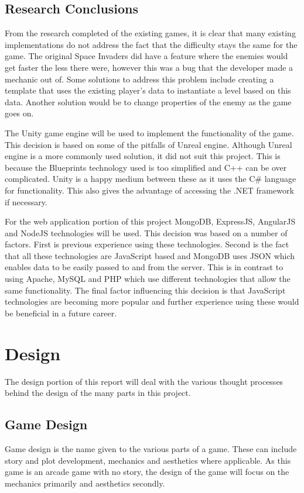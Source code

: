 \documentclass[12pt]{article}
\begin{document}
\subsection{Research Conclusions}
From the research completed of the existing games, it is clear that many existing implementations do not address the fact that the difficulty stays the same for the game. The original Space Invaders did have a feature where the enemies would get faster the less there were, however this was a bug that the developer made a mechanic out of. Some solutions to address this problem include creating a template that uses the existing player's data to instantiate a level based on this data. Another solution would be to change properties of the enemy as the game goes on. 

The Unity game engine will be used to implement the functionality of the game. This decision is based on some of the pitfalls of Unreal engine. Although Unreal engine is a more commonly used solution, it did not suit this project. This is because the Blueprints technology used is too simplified and C++ can be over complicated. Unity is a happy medium between these as it uses the C{\#} language for functionality. This also gives the advantage of accessing the .NET framework if necessary. 

For the web application portion of this project MongoDB, ExpressJS, AngularJS and NodeJS technologies will be used. This decision was based on a number of factors. First is previous experience using these technologies. Second is the fact that all these technologies are JavaScript based and MongoDB uses JSON which enables data to be easily passed to and from the server. This is in contrast to using Apache, MySQL and PHP which use different technologies that allow the same functionality. The final factor influencing this decision is that JavaScript technologies are becoming more popular and further experience using these would be beneficial in a future career. 

\newpage
\section{Design}
The design portion of this report will deal with the various thought processes behind the design of the many parts in this project. 

\subsection{Game Design}
Game design is the name given to the various parts of a game. These can include story and plot development, mechanics and aesthetics where applicable. As this game is an arcade game with no story, the design of the game will focus on the mechanics primarily and aesthetics secondly. 
\end{document}
